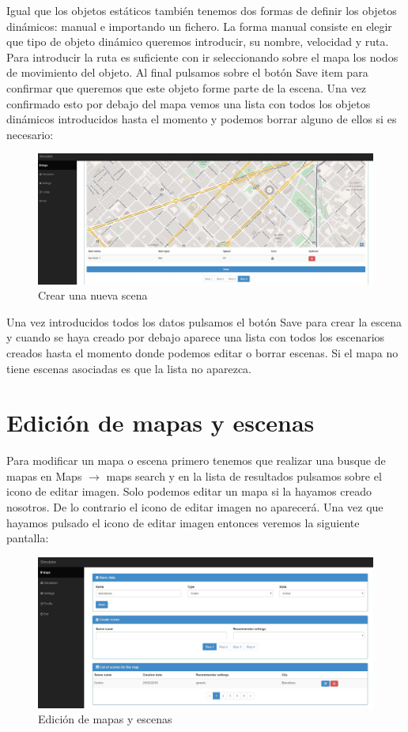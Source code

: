 Igual que los objetos estáticos también tenemos dos formas de definir los objetos dinámicos: manual e importando un fichero. La forma manual consiste en elegir que tipo de objeto dinámico queremos introducir, su nombre, velocidad y ruta. Para introducir la ruta es suficiente con ir seleccionando sobre el mapa los nodos de movimiento del objeto. Al final pulsamos sobre el botón Save item para confirmar que queremos que este objeto forme parte de la escena. Una vez confirmado esto por debajo del mapa vemos una lista con todos los objetos dinámicos introducidos hasta el momento y podemos borrar alguno de ellos si es necesario:

\begin{figure}[H]
	\centering\includegraphics[scale=0.25]{imagenes/capitulo9/crear-escena-4-1.jpg}
	\caption{Crear una nueva scena}
	\label{img:AddScena41}
\end{figure}

Una vez introducidos todos los datos pulsamos el botón Save para crear la escena y cuando se haya creado por debajo aparece una lista con todos los escenarios creados hasta el momento donde podemos editar o borrar escenas. Si el mapa no tiene escenas asociadas es que la lista no aparezca.

\section{Edición de mapas y escenas}

Para modificar un mapa o escena primero tenemos que realizar una busque de mapas en Maps $\rightarrow$ maps search y en la lista de resultados pulsamos sobre el icono de editar imagen. Solo podemos editar un mapa si la hayamos creado nosotros. De lo contrario el icono de editar imagen no aparecerá. Una vez que hayamos pulsado el icono de editar imagen entonces veremos la siguiente pantalla:

\begin{figure}[H]
	\centering\includegraphics[scale=0.25]{imagenes/capitulo10/capitulo10.jpg}
	\caption{Edición de mapas y escenas}
	\label{img:UpdateMapScene}
\end{figure}

